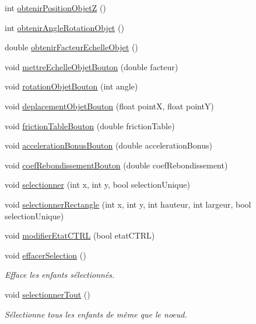 \begin{DoxyCompactItemize}
\item 
int \hyperlink{group__inf2990_gadbef9c5a1e0a2c76a0de1186763b4801}{obtenir\+Position\+ObjetZ} ()
\item 
int \hyperlink{group__inf2990_ga23433e7ffee476584b4744e788e852cd}{obtenir\+Angle\+Rotation\+Objet} ()
\item 
double \hyperlink{group__inf2990_ga57c0c4ae3a71280a05382ff4d5e12e54}{obtenir\+Facteur\+Echelle\+Objet} ()
\item 
void \hyperlink{group__inf2990_ga4800fc8f01068272efcd95566afcf6d0}{mettre\+Echelle\+Objet\+Bouton} (double facteur)
\item 
void \hyperlink{group__inf2990_ga3b73f7b713b8a145864d4fe9a14364fb}{rotation\+Objet\+Bouton} (int angle)
\item 
void \hyperlink{group__inf2990_ga747d92f0e95625f5efd1e0ea6c0d7335}{deplacement\+Objet\+Bouton} (float pointX, float pointY)
\item 
void \hyperlink{group__inf2990_ga9bf185e12bfee5ee7578510184a982bd}{friction\+Table\+Bouton} (double friction\+Table)
\item 
void \hyperlink{group__inf2990_ga25fbe237c5982b3d1cacc1c83473dae5}{acceleration\+Bonus\+Bouton} (double acceleration\+Bonus)
\item 
void \hyperlink{group__inf2990_ga6f6a68a9d911937984a82e2695833f6b}{coef\+Rebondissement\+Bouton} (double coef\+Rebondissement)
\item 
void \hyperlink{group__inf2990_gab7f0c394d8d0146df2d650fa4bacfa0c}{selectionner} (int x, int y, bool selection\+Unique)
\item 
void \hyperlink{group__inf2990_gadd21511d1467ade48b9cd03ea6e2519d}{selectionner\+Rectangle} (int x, int y, int hauteur, int largeur, bool selection\+Unique)
\item 
void \hyperlink{group__inf2990_gac902d1469506a0bff2f1ef4e7807ded1}{modifier\+Etat\+C\+T\+RL} (bool etat\+C\+T\+RL)
\item 
void \hyperlink{group__inf2990_ga69c996f033b587e631ad3c620002ed98}{effacer\+Selection} ()
\begin{DoxyCompactList}\small\item\em Efface les enfants sélectionnés. \end{DoxyCompactList}\item 
void \hyperlink{group__inf2990_ga6741b9a8e4d6e0b3405543e999709350}{selectionner\+Tout} ()
\begin{DoxyCompactList}\small\item\em Sélectionne tous les enfants de même que le noeud. \end{DoxyCompactList}\item 

\end{DoxyCompactItemize}
